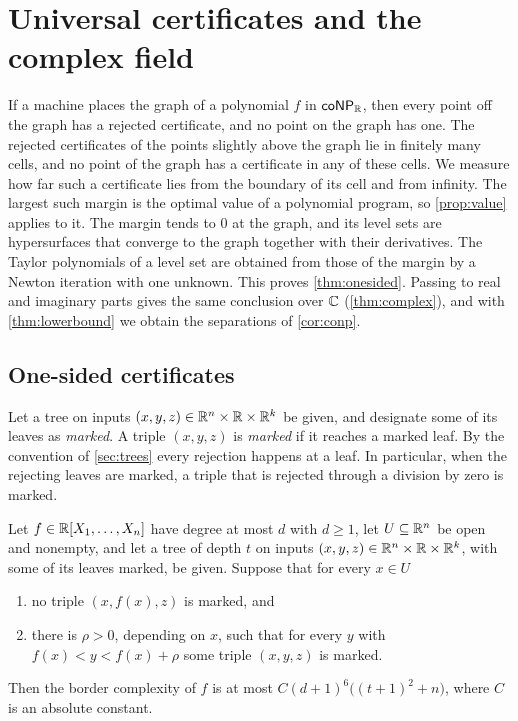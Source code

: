 \section{Universal certificates and the complex field}\label{sec:universal}

If a machine places the graph of a polynomial $f$ in $\textsf{\upshape coNP}_{\mathbb{R}}$, then every point off the graph has a rejected certificate, and no point on the graph has one. The rejected certificates of the points slightly above the graph lie in finitely many cells, and no point of the graph has a certificate in any of these cells. We measure how far such a certificate lies from the boundary of its cell and from infinity. The largest such margin is the optimal value of a polynomial program, so \cref{prop:value} applies to it. The margin tends to $0$ at the graph, and its level sets are hypersurfaces that converge to the graph together with their derivatives. The Taylor polynomials of a level set are obtained from those of the margin by a Newton iteration with one unknown. This proves \cref{thm:onesided}. Passing to real and imaginary parts gives the same conclusion over $\mathbb{C}$ (\cref{thm:complex}), and with \cref{thm:lowerbound} we obtain the separations of \cref{cor:conp}.

\subsection{One-sided certificates}\label{sec:universal-onesided}

Let a tree on inputs $(x,y,z)\in\mathbb{R}^n\times\mathbb{R}\times\mathbb{R}^k$ be given, and designate some of its leaves as \emph{marked}. A triple $(x,y,z)$ is \emph{marked} if it reaches a marked leaf. By the convention of \cref{sec:trees} every rejection happens at a leaf. In particular, when the rejecting leaves are marked, a triple that is rejected through a division by zero is marked.

\begin{theorem}\label{thm:onesided}
Let $f\in\mathbb{R}[X_1,\dots,X_n]$ have degree at most $d$ with $d\ge1$, let $U\subseteq\mathbb{R}^n$ be open and nonempty, and let a tree of depth $t$ on inputs $(x,y,z)\in\mathbb{R}^n\times\mathbb{R}\times\mathbb{R}^k$, with some of its leaves marked, be given. Suppose that for every $x\in U$
\begin{enumerate}[label=\textup{(\roman*)}]
\item no triple $(x,f(x),z)$ is marked, and
\item there is $\rho>0$, depending on $x$, such that for every $y$ with $f(x)<y<f(x)+\rho$ some triple $(x,y,z)$ is marked.
\end{enumerate}
Then the border complexity of $f$ is at most $C(d+1)^6\bigl((t+1)^2+n\bigr)$, where $C$ is an absolute constant.
\end{theorem}


